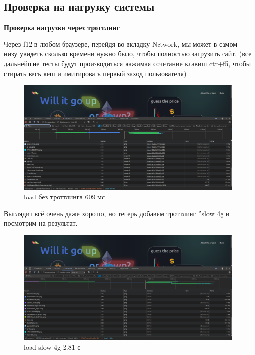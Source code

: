 \documentclass[a4paper, 12pt]{article}
\begin{document}
\subsection{Проверка на нагрузку системы}

\textbf{Проверка нагрузки через троттлинг}

Через f12 в любом браузере, перейдя во вкладку Network, мы может в самом низу увидеть сколько времени нужно было, чтобы полностью загрузить сайт. (все дальнейшие тесты будут производиться нажимая сочетание клавиш ctr+f5, чтобы стирать весь кеш и имитировать первый заход пользователя)

\newpage
\begin{figure}[h!]
    \noindent
    \centering
    \includegraphics[width=1\linewidth]{pic_load_f12_1.png}
    \caption{load без троттлинга 609 мс}
\end{figure}

Выглядит всё очень даже хорошо, но теперь добавим троттлинг ''slow 4g и посмотрим на результат.

\begin{figure}[h!]
    \noindent
    \centering
    \includegraphics[width=1\linewidth]{pic_load_f12_2.png}
    \caption{load slow 4g 2.81 с}
\end{figure}
\end{document}
